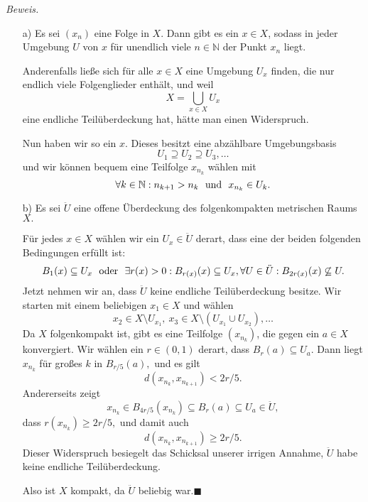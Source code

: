 \documentclass[12pt]{scrbook}   %
\begin{document}
{\it Beweis.} 
\begin{itemize}
\item[a)] Es sei $(x_n)$ eine Folge in $X.$ Dann gibt es ein $x\in X$, sodass
in jeder Umgebung $U$ von $x$ für unendlich viele $n\in \mathbb N$ der Punkt
$x_n$ liegt. 

Anderenfalls ließe sich für alle $x\in X$ eine Umgebung $U_x$ finden, die
nur endlich viele Folgenglieder enthält, und weil 
$$X=\bigcup_{x\in X} U_x$$
eine endliche Teilüberdeckung hat, hätte man einen Widerspruch.

Nun haben wir so ein $x.$ Dieses besitzt eine abzählbare Umgebungsbasis
$$U_1\supseteq U_2 \supseteq U_3,\dots$$
und wir können bequem eine Teilfolge $x_{n_k}$ wählen mit 
$$\forall k\in \mathbb N:n_{k+1} > n_{k} \ \ {\rm und }\ \ x_{n_k}\in U_k.$$
\item[b)] Es sei $\ddot U$ eine offene Überdeckung des folgenkompakten 
metrischen Raums $X.$ 

Für jedes $x\in X$ wählen wir ein $U_x\in \ddot U$ derart, dass eine der
beiden folgenden Bedingungen erfüllt ist:
$$B_1(x)\subseteq U_x\ \ {\rm  oder }\ \ 
\exists r(x)>0 : B_{r(x)}(x)\subseteq U_x, \forall U\in \ddot U: 
B_{2r(x)}(x)\not\subseteq U.$$
Jetzt nehmen wir an, dass $\ddot U$ keine endliche Teilüberdeckung besitze.
Wir starten mit einem beliebigen $x_1\in X$ und wählen 
$$x_2\in X\setminus U_{x_1},\ 
x_3\in X\setminus(U_{x_1}\cup U_{x_2}),\dots$$
Da $X$ folgenkompakt ist, gibt es eine Teilfolge $(x_{n_k})$, die gegen ein
$a\in X$ konvergiert. Wir wählen ein $r\in (0,1)$ derart, dass
$B_r(a)\subseteq U_a.$ Dann liegt $x_{n_k}$  für 
großes $k$ in $B_{r/5}(a),$ und es gilt 
$$d(x_{n_k},x_{n_{k+1}}) < 2r/5.$$
Andererseits zeigt
$$x_{n_k}\in B_{4r/5}(x_{n_k})\subseteq B_{r}(a)\subseteq U_a\in \ddot U,$$
dass $r(x_{n_k})\geq 2r/5,$ und damit auch 
$$d(x_{n_k},x_{n_{k+1}}) \geq 2r/5.$$
Dieser Widerspruch besiegelt das Schicksal unserer irrigen Annahme, $\ddot U$
habe keine endliche Teilüberdeckung. 

Also ist $X$ kompakt, da $\ddot U$ beliebig war.\hfill{$\blacksquare$}
\end{itemize}
\end{document}
